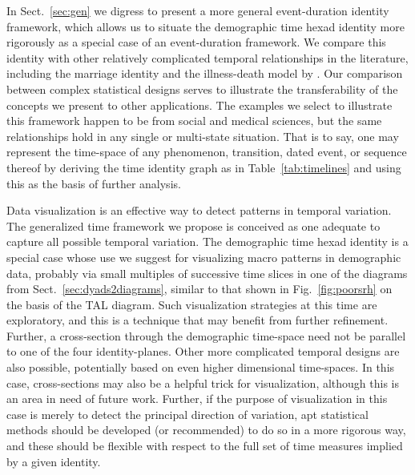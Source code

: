 \documentclass{bmcart}
\theoremstyle{definition}
\begin{document}
In Sect.~\ref{sec:gen} we digress to present a more general event-duration identity framework, which allows us to situate the demographic time hexad identity more
rigorously as a special case of an event-duration framework. We compare this
identity with other relatively complicated temporal relationships in the literature, including the \citet{lexis1875einleitung}
marriage identity and the illness-death model by \citet{brinks2014lexis}. Our comparison between complex statistical designs serves to illustrate the
transferability of the concepts we present to other applications. The
examples we select to illustrate this framework happen to be from social and
medical sciences, but the same relationships hold in any single or multi-state
situation. That is to say, one may represent the time-space of any phenomenon,
transition, dated event, or sequence thereof by deriving the time identity graph
as in Table~\ref{tab:timelines} and using this as the basis of further
analysis. 

Data visualization is an effective way to detect patterns in temporal variation. The generalized time framework we propose is conceived as one
adequate to capture all possible temporal variation. The demographic time hexad identity is a special case whose use we suggest for
visualizing macro patterns in demographic data, probably via small multiples of
successive time slices in one of the diagrams from Sect.~\ref{sec:dyads2diagrams}, similar to that shown in Fig.~\ref{fig:poorsrh} on the basis of the TAL diagram.
Such visualization strategies at this time are exploratory, and this is a
technique that may benefit from further refinement. Further, a cross-section
through the demographic time-space need not be parallel to one of the four
identity-planes. Other more complicated temporal designs are also possible,
potentially based on even higher dimensional time-spaces. In this case,
cross-sections may also be a helpful trick for visualization, although this is
an area in need of future work. Further, if the purpose of visualization in
this case is merely to detect the principal direction of variation, apt
statistical methods should be developed (or recommended) to do so in a more
rigorous way, and these should be flexible with respect to the full set of time measures implied by a given
identity.
\end{document}
